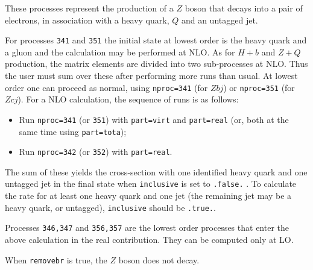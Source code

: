 \documentclass[12pt]{article}
\begin{document}
These processes represent the production of a $Z$
boson that decays into a pair of electrons,
in association with a heavy quark, $Q$ and an untagged jet.

For processes {\tt 341} and {\tt 351} the initial
state at lowest order is the heavy quark and a gluon and 
the calculation may be performed at NLO.
As for $H+b$ and $Z+Q$ production, the matrix elements are divided into two
sub-processes at NLO. Thus the user must sum over these after performing
more runs than usual. At lowest order one can proceed as normal, using
{\tt nproc=341} (for $Zbj$) or {\tt nproc=351} (for $Zcj$).
For a NLO calculation, the sequence of runs is as follows:
\begin{itemize}
\item Run {\tt nproc=341} (or {\tt 351}) with {\tt part=virt} and
{\tt part=real} (or, both at the same time using {\tt part=tota});
\item Run {\tt nproc=342} (or {\tt 352}) with {\tt part=real}.
\end{itemize}
The sum of these yields the cross-section with one identified heavy quark and one
untagged jet in
the final state when {\tt inclusive} is set to {\tt .false.} . To calculate the
rate for at least one heavy quark and one jet (the remaining jet may be a heavy quark,
or untagged), {\tt inclusive} should be {\tt .true.}.

Processes {\tt 346,347} and {\tt 356,357} are the lowest order processes that enter
the above calculation in the real contribution. They can be computed only at LO.

When {\tt removebr} is true, the $Z$ boson does not decay.
\end{document}
